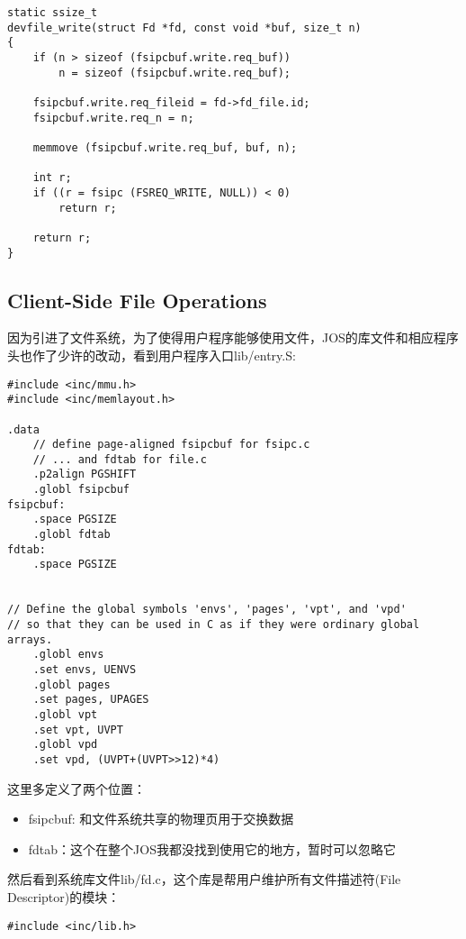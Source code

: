 \documentclass{article}
\begin{document}
\begin{CJK*}{UTF8}{gkai}
\begin{lstlisting}[style=ccode, title={\scriptsize \ttfamily \bfseries lib/file.c: devfile\_write()}]
static ssize_t
devfile_write(struct Fd *fd, const void *buf, size_t n)
{
    if (n > sizeof (fsipcbuf.write.req_buf))
        n = sizeof (fsipcbuf.write.req_buf);

    fsipcbuf.write.req_fileid = fd->fd_file.id;
    fsipcbuf.write.req_n = n;

    memmove (fsipcbuf.write.req_buf, buf, n);

    int r;
    if ((r = fsipc (FSREQ_WRITE, NULL)) < 0)
        return r;

    return r;
}
\end{lstlisting}


\subsection{Client-Side File Operations}

因为引进了文件系统，为了使得用户程序能够使用文件，JOS的库文件和相应程序头也作了少许的改动，看到用户程序入口lib/entry.S:

\begin{lstlisting}[style=acode, title={\scriptsize \ttfamily \bfseries lib/entry.S}]
#include <inc/mmu.h>
#include <inc/memlayout.h>

.data
	// define page-aligned fsipcbuf for fsipc.c
	// ... and fdtab for file.c
	.p2align PGSHIFT
	.globl fsipcbuf
fsipcbuf:
	.space PGSIZE
	.globl fdtab
fdtab:
	.space PGSIZE


// Define the global symbols 'envs', 'pages', 'vpt', and 'vpd'
// so that they can be used in C as if they were ordinary global arrays.
	.globl envs
	.set envs, UENVS
	.globl pages
	.set pages, UPAGES
	.globl vpt
	.set vpt, UVPT
	.globl vpd
	.set vpd, (UVPT+(UVPT>>12)*4)
\end{lstlisting}

这里多定义了两个位置：

\begin{itemize}
\item{fsipcbuf: 和文件系统共享的物理页用于交换数据}
\item{fdtab：这个在整个JOS我都没找到使用它的地方，暂时可以忽略它}
\end{itemize}

然后看到系统库文件lib/fd.c，这个库是帮用户维护所有文件描述符(File Descriptor)的模块：

\begin{lstlisting}[style=ccode, title={\scriptsize \ttfamily \bfseries lib/fd.c}]
#include <inc/lib.h>


\end{lstlisting}
\end{CJK*}
\end{document}
